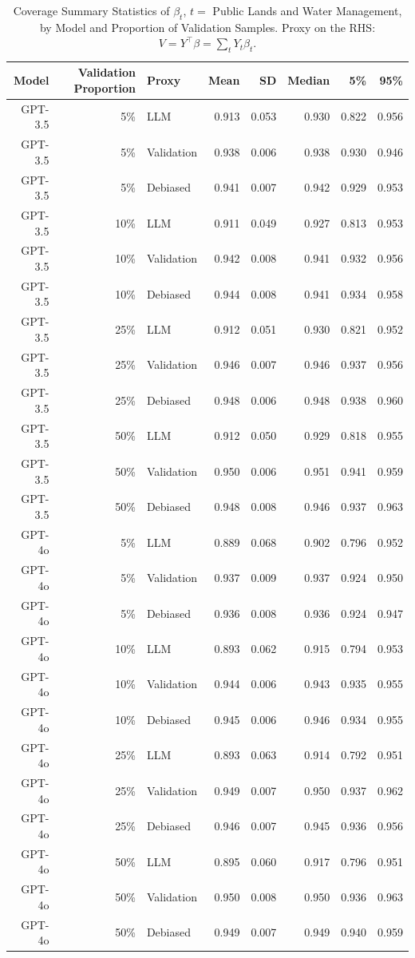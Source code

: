 \begin{table}

\caption{Coverage Summary Statistics of $\beta_{t}$, $t=$ Public Lands and Water Management, by Model and Proportion of Validation Samples. Proxy on the RHS: $V = Y^\top \beta = \sum_{t} Y_t \beta_t$.}
\centering
\begin{tabular}[t]{rrlrrrrr}
\toprule
Model & Validation Proportion & Proxy & Mean & SD & Median & 5\% & 95\%\\
\midrule
GPT-3.5 & 5\% & LLM & 0.913 & 0.053 & 0.930 & 0.822 & 0.956\\
GPT-3.5 & 5\% & Validation & 0.938 & 0.006 & 0.938 & 0.930 & 0.946\\
GPT-3.5 & 5\% & Debiased & 0.941 & 0.007 & 0.942 & 0.929 & 0.953\\
GPT-3.5 & 10\% & LLM & 0.911 & 0.049 & 0.927 & 0.813 & 0.953\\
GPT-3.5 & 10\% & Validation & 0.942 & 0.008 & 0.941 & 0.932 & 0.956\\
GPT-3.5 & 10\% & Debiased & 0.944 & 0.008 & 0.941 & 0.934 & 0.958\\
GPT-3.5 & 25\% & LLM & 0.912 & 0.051 & 0.930 & 0.821 & 0.952\\
GPT-3.5 & 25\% & Validation & 0.946 & 0.007 & 0.946 & 0.937 & 0.956\\
GPT-3.5 & 25\% & Debiased & 0.948 & 0.006 & 0.948 & 0.938 & 0.960\\
GPT-3.5 & 50\% & LLM & 0.912 & 0.050 & 0.929 & 0.818 & 0.955\\
GPT-3.5 & 50\% & Validation & 0.950 & 0.006 & 0.951 & 0.941 & 0.959\\
GPT-3.5 & 50\% & Debiased & 0.948 & 0.008 & 0.946 & 0.937 & 0.963\\
GPT-4o & 5\% & LLM & 0.889 & 0.068 & 0.902 & 0.796 & 0.952\\
GPT-4o & 5\% & Validation & 0.937 & 0.009 & 0.937 & 0.924 & 0.950\\
GPT-4o & 5\% & Debiased & 0.936 & 0.008 & 0.936 & 0.924 & 0.947\\
GPT-4o & 10\% & LLM & 0.893 & 0.062 & 0.915 & 0.794 & 0.953\\
GPT-4o & 10\% & Validation & 0.944 & 0.006 & 0.943 & 0.935 & 0.955\\
GPT-4o & 10\% & Debiased & 0.945 & 0.006 & 0.946 & 0.934 & 0.955\\
GPT-4o & 25\% & LLM & 0.893 & 0.063 & 0.914 & 0.792 & 0.951\\
GPT-4o & 25\% & Validation & 0.949 & 0.007 & 0.950 & 0.937 & 0.962\\
GPT-4o & 25\% & Debiased & 0.946 & 0.007 & 0.945 & 0.936 & 0.956\\
GPT-4o & 50\% & LLM & 0.895 & 0.060 & 0.917 & 0.796 & 0.951\\
GPT-4o & 50\% & Validation & 0.950 & 0.008 & 0.950 & 0.936 & 0.963\\
GPT-4o & 50\% & Debiased & 0.949 & 0.007 & 0.949 & 0.940 & 0.959\\
\bottomrule
\end{tabular}
\end{table}
